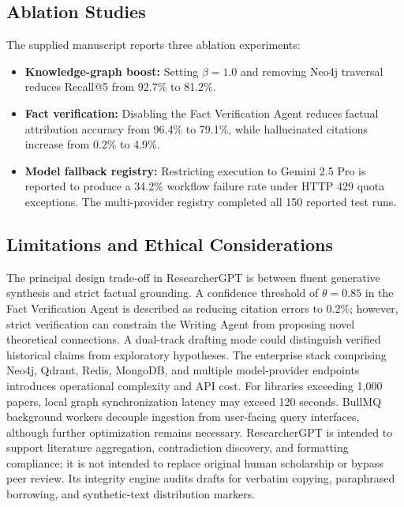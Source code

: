 \documentclass[conference]{IEEEtran}
\begin{document}
\subsection{Ablation Studies}
The supplied manuscript reports three ablation experiments:
\begin{itemize}
\item \textbf{Knowledge-graph boost:} Setting $\beta=1.0$ and removing Neo4j traversal reduces Recall@5 from 92.7\% to 81.2\%.
\item \textbf{Fact verification:} Disabling the Fact Verification Agent reduces factual attribution accuracy from 96.4\% to 79.1\%, while hallucinated citations increase from 0.2\% to 4.9\%.
\item \textbf{Model fallback registry:} Restricting execution to Gemini 2.5 Pro is reported to produce a 34.2\% workflow failure rate under HTTP 429 quota exceptions. The multi-provider registry completed all 150 reported test runs.
\end{itemize}
\subsection{Limitations and Ethical Considerations}
The principal design trade-off in ResearcherGPT is between fluent generative synthesis and strict factual grounding. A confidence threshold of $\theta=0.85$ in the Fact Verification Agent is described as reducing citation errors to 0.2\%; however, strict verification can constrain the Writing Agent from proposing novel theoretical connections. A dual-track drafting mode could distinguish verified historical claims from exploratory hypotheses.
The enterprise stack comprising Neo4j, Qdrant, Redis, MongoDB, and multiple model-provider endpoints introduces operational complexity and API cost. For libraries exceeding 1,000 papers, local graph synchronization latency may exceed 120 seconds. BullMQ background workers decouple ingestion from user-facing query interfaces, although further optimization remains necessary.
ResearcherGPT is intended to support literature aggregation, contradiction discovery, and formatting compliance; it is not intended to replace original human scholarship or bypass peer review. Its integrity engine audits drafts for verbatim copying, paraphrased borrowing, and synthetic-text distribution markers.
\end{document}
